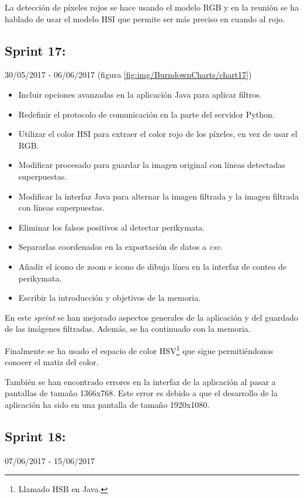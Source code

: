 La detección de píxeles rojos se hace usando el modelo RGB \cite{wiki:RGB} y en la reunión se ha hablado de usar el modelo HSI \cite{wiki:spaceHSV_HSI_HSL} que permite ser más preciso en cuando al rojo.

\newpage

\subsection{Sprint 17:}
30/05/2017 - 06/06/2017 (figura \ref{fig:img/BurndownCharts/chart17})
\begin{itemize}
    \item Incluir opciones avanzadas en la aplicación Java para aplicar filtros. 
    \item Redefinir el protocolo de comunicación en la parte del servidor Python.
    \item Utilizar el color HSI para extraer el color rojo de los píxeles, en vez de usar el RGB.
    \item Modificar procesado para guardar la imagen original con líneas detectadas superpuestas.
    \item Modificar la interfaz Java para alternar la imagen filtrada y la imagen filtrada con líneas superpuestas.
    \item Eliminar los falsos positivos al detectar perikymata.
    \item Separarlas coordenadas en la exportación de datos a \textit{csv}.
    \item Añadir el icono de zoom e icono de dibuja línea en la interfaz de conteo de perikymata.
    \item Escribir la introducción y objetivos de la memoria.
\end{itemize}

En este \textit{sprint} se han mejorado aspectos generales de la aplicación y del guardado de las imágenes filtradas. Además, se ha continuado con la memoria.

Finalmente se ha usado el espacio de color HSV\footnote{Llamado HSB en Java.} que sigue permitiéndonos conocer el matiz del color.

También se han encontrado errores en la interfaz de la aplicación al pasar a pantallas de tamaño 1366x768. Este error es debido a que el desarrollo de la aplicación ha sido en una pantalla de tamaño 1920x1080.

\subsection{Sprint 18:}
07/06/2017 - 15/06/2017


